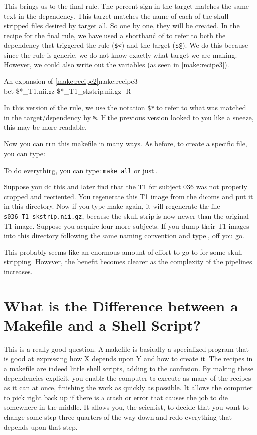 This brings us to the final rule. The percent sign in the target matches the same text in the dependency. This target matches the name of each of the skull stripped files desired by target all. So one by one, they will be created. In the recipe for the final rule, we have used a shorthand of \maken{} to refer to both the dependency that triggered the rule (\texttt{\$<}) and the target (\texttt{\$@}). We do this because since the rule is generic, we do not know exactly what target we are making. However, we could also write out the variables (as seen in \autoref{make:recipe3}).
	
\begin{make}{An expansion of \autoref{make:recipe2}}{make:recipe3}
	 \\
	\tab bet \$*_T1.nii.gz \$*_T1_skstrip.nii.gz -R
\end{make}
	
In this version of the rule, we use the notation \texttt{\$*} to refer to what was matched in the target/dependency by \texttt{\%}. If the previous version looked to you like a sneeze, this may be more readable.
	
Now you can run this makefile in many ways. As before, to create a specific file, you can type:	
	
To do everything, you can type: \texttt{make all} or just \maken{}.
	
Suppose you do this and later find that the T1 for subject 036 was not properly cropped and reoriented. You regenerate this T1 image from the dicoms and put it in this directory. Now if you type make again, it will regenerate the file \texttt{s036_T1_skstrip.nii.gz}, because the skull strip is now newer than the original T1 image. Suppose you acquire four more subjects. If you dump their T1 images into this directory following the same naming convention and type \maken{}, off you go.

This probably seems like an enormous amount of effort to go to for some skull stripping. However, the benefit becomes clearer as the complexity of the pipelines increases.
	
\section{What is the Difference between a Makefile and a Shell Script?}
	
This is a really good question. A makefile is basically a specialized program that is good at expressing how X depends upon Y and how to create it. The recipes in a makefile are indeed little shell scripts, adding to the confusion. By making these dependencies explicit, you enable the computer to execute as many of the recipes as it can at once, finishing the work as quickly as possible. It allows the computer to pick right back up if there is a crash or error that  causes the job to die somewhere in the middle. It allows you, the scientist, to decide that you want to change some step three-quarters of the way down and redo everything that depends upon that step.
	
